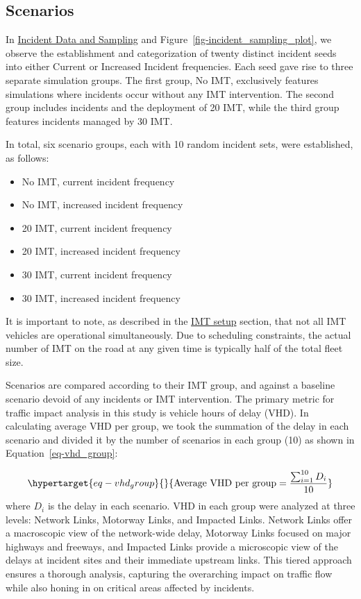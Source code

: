 \documentclass[fancy, oneside, mastersfancy, ms]{byuthesis}
\providecommand{\tightlist}{%
  \setlength{\itemsep}{0pt}\setlength{\parskip}{0pt}}\usepackage{longtable,booktabs,array}
\begin{document}
\hypertarget{sec-scenarios}{%
\subsection{Scenarios}\label{sec-scenarios}}

In \protect\hyperlink{sec-inc_data}{Incident Data and Sampling} and
Figure~\ref{fig-incident_sampling_plot}, we observe the establishment
and categorization of twenty distinct incident seeds into either Current
or Increased Incident frequencies. Each seed gave rise to three separate
simulation groups. The first group, No IMT, exclusively features
simulations where incidents occur without any IMT intervention. The
second group includes incidents and the deployment of 20 IMT, while the
third group features incidents managed by 30 IMT.

In total, six scenario groups, each with 10 random incident sets, were
established, as follows:

\begin{itemize}
\tightlist
\item
  No IMT, current incident frequency
\item
  No IMT, increased incident frequency
\item
  20 IMT, current incident frequency
\item
  20 IMT, increased incident frequency
\item
  30 IMT, current incident frequency
\item
  30 IMT, increased incident frequency
\end{itemize}

It is important to note, as described in the
\protect\hyperlink{sec-IMT_setup}{IMT setup} section, that not all IMT
vehicles are operational simultaneously. Due to scheduling constraints,
the actual number of IMT on the road at any given time is typically half
of the total fleet size.

Scenarios are compared according to their IMT group, and against a
baseline scenario devoid of any incidents or IMT intervention. The
primary metric for traffic impact analysis in this study is vehicle
hours of delay (VHD). In calculating average VHD per group, we took the
summation of the delay in each scenario and divided it by the number of
scenarios in each group (10) as shown in Equation~\ref{eq-vhd_group}:

\begin{equation}\protect\hypertarget{eq-vhd_group}{}{
\text{Average VHD per group} = \frac{\sum_{i=1}^{10} D_i}{10}
}\label{eq-vhd_group}\end{equation} where \(D_i\) is the delay in each
scenario. VHD in each group were analyzed at three levels: Network
Links, Motorway Links, and Impacted Links. Network Links offer a
macroscopic view of the network-wide delay, Motorway Links focused on
major highways and freeways, and Impacted Links provide a microscopic
view of the delays at incident sites and their immediate upstream links.
This tiered approach ensures a thorough analysis, capturing the
overarching impact on traffic flow while also honing in on critical
areas affected by incidents.
\end{document}
